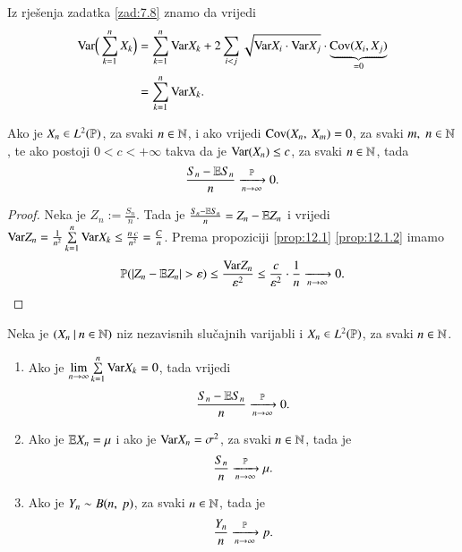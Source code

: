\begin{rj}[\ref{zad:12.4}]
    Iz rje\v senja zadatka \ref{zad:7.8} znamo da vrijedi
    \begin{equation*}
        \begin{aligned}
            \mathrm{Var} \Big( \sum\limits_{k = 1}^{n} X_k \Big) &= \sum\limits_{k = 1}^{n} \mathrm{Var} X_k + 2 \sum\limits_{i < j}^{} \sqrt{\mathrm{Var} X_i \cdot \mathrm{Var} X_j} \cdot \underbrace{\mathrm{Cov} (X_i, X_j)}_{= 0}\\
            &= \sum\limits_{k = 1}^{n} \mathrm{Var} X_k.
        \end{aligned}
    \end{equation*}
\end{rj}

\begin{tm}  \label{tm:12.5}
    Ako je $X_n \in L^2 (\mathbb{P})$, za svaki $n \in \mathbb{N}$, i ako vrijedi $\mathrm{Cov} ({X_n}, \: {X_m}) = 0$, za svaki $m, \; n \in \mathbb{N}$, te ako postoji $0 < c < + \infty$ takva da je $\mathrm{Var} (X_n) \leq c$, za svaki $n \in \mathbb{N}$, tada
    \begin{equation*}
        \frac{S_n - \mathbb{E} S_n}{n} \xrightarrow[n \to \infty]{\mathbb{P}} 0.
    \end{equation*}
\end{tm}

\begin{proof}
    Neka je $Z_n := \frac{S_n}{n}$.
    Tada je $\frac{S_n - \mathbb{E} S_n}{n} = Z_n - \mathbb{E} Z_n$ i vrijedi $\mathrm{Var} Z_n = \frac{1}{n^2} \sum\limits_{k = 1}^{n} \mathrm{Var} X_k \leq \frac{n \: c}{n^2} = \frac{C}{n}$.
    Prema propoziciji \ref{prop:12.1} \ref{prop:12.1.2} imamo
    \begin{equation*}
        \mathbb{P}({|Z_n - \mathbb{E} Z_n| > \varepsilon}) \leq \frac{\mathrm{Var} Z_n}{\varepsilon^2} \leq \frac{c}{\varepsilon^2} \cdot \frac{1}{n} \xrightarrow[n \to \infty]{} 0.
    \end{equation*}
\end{proof}

\begin{zad} \label{zad:12.6}
    Neka je $({X_n} \: | \: {n \in \mathbb{N}})$ niz nezavisnih slu\v cajnih varijabli i $X_n \in L^2(\mathbb{P})$, za svaki $n \in \mathbb{N}$.
    \begin{enumerate}[label=(\alph*)]
        \item Ako je $\lim\limits_{n \to \infty} \sum\limits_{k = 1}^{n} \mathrm{Var} X_k = 0$, tada vrijedi
        \begin{equation*}
            \frac{S_n - \mathbb{E} S_n}{n} \xrightarrow[n \to \infty]{\mathbb{P}} 0.
        \end{equation*}
        \item Ako je $\mathbb{E} X_n = \mu$ i ako je $\mathrm{Var} X_n = \sigma^2$, za svaki $n \in \mathbb{N}$, tada je
        \begin{equation*}
            \frac{S_n}{n} \xrightarrow[n \to \infty]{\mathbb{P}} \mu.
        \end{equation*}
        \item Ako je $Y_n \sim B ({n}, \: {p})$, za svaki $n \in \mathbb{N}$, tada je
        \begin{equation*}
            \frac{Y_n}{n} \xrightarrow[n \to \infty]{\mathbb{P}} p.
        \end{equation*}
    \end{enumerate}
\end{zad}

